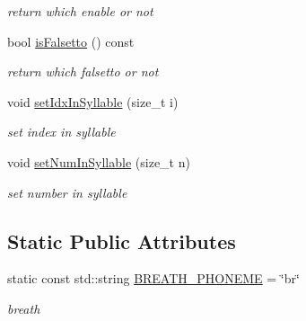 \begin{DoxyCompactItemize}
\begin{DoxyCompactList}\small\item\em return which enable or not \end{DoxyCompactList}\item 
bool \hyperlink{classsinsy_1_1PhonemeLabeler_ae008a05b6aa85f3be4b3be4ad40723d5}{is\-Falsetto} () const 
\begin{DoxyCompactList}\small\item\em return which falsetto or not \end{DoxyCompactList}\item 
\hypertarget{classsinsy_1_1PhonemeLabeler_a9ac53e781dab8cbf0da15964e4c25578}{void \hyperlink{classsinsy_1_1PhonemeLabeler_a9ac53e781dab8cbf0da15964e4c25578}{set\-Idx\-In\-Syllable} (size\-\_\-t i)}\label{classsinsy_1_1PhonemeLabeler_a9ac53e781dab8cbf0da15964e4c25578}

\begin{DoxyCompactList}\small\item\em set index in syllable \end{DoxyCompactList}\item 
\hypertarget{classsinsy_1_1PhonemeLabeler_abf22d073b4da217e44ed19d4bc77ae6e}{void \hyperlink{classsinsy_1_1PhonemeLabeler_abf22d073b4da217e44ed19d4bc77ae6e}{set\-Num\-In\-Syllable} (size\-\_\-t n)}\label{classsinsy_1_1PhonemeLabeler_abf22d073b4da217e44ed19d4bc77ae6e}

\begin{DoxyCompactList}\small\item\em set number in syllable \end{DoxyCompactList}\end{DoxyCompactItemize}
\subsection*{\-Static \-Public \-Attributes}
\begin{DoxyCompactItemize}
\item 
\hypertarget{classsinsy_1_1PhonemeLabeler_a9697c89f582c840942046e007e95342b}{static const std\-::string \hyperlink{classsinsy_1_1PhonemeLabeler_a9697c89f582c840942046e007e95342b}{\-B\-R\-E\-A\-T\-H\-\_\-\-P\-H\-O\-N\-E\-M\-E} = \char`\"{}br\char`\"{}}\label{classsinsy_1_1PhonemeLabeler_a9697c89f582c840942046e007e95342b}

\begin{DoxyCompactList}\small\item\em breath \end{DoxyCompactList}\end{DoxyCompactItemize}


